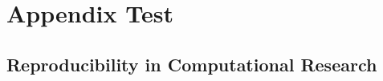 

\chapter{Appendix Test}

\section{Reproducibility in Computational Research}

\textcite{Sumatra2012}